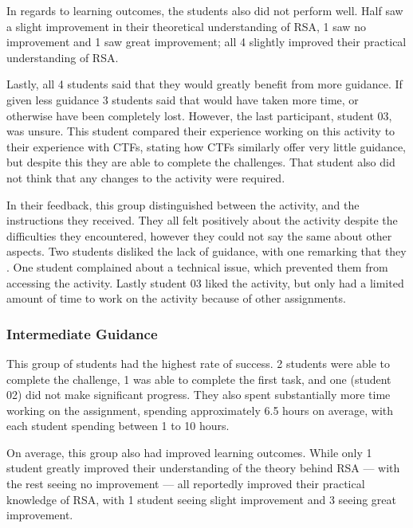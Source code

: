             In regards to learning outcomes, the students also did not perform well. %
Half saw a slight improvement in their theoretical understanding of RSA, 1 saw no improvement and 1 saw great improvement; %
all 4 slightly improved their practical understanding of RSA. 

            Lastly, all 4 students said that they would greatly benefit from more guidance. %
If given less guidance 3 students said that would have taken more time, or otherwise have been completely lost. %
However, the last participant, student 03, was unsure. %
This student compared their experience working on this activity to their experience with CTFs, stating how CTFs similarly offer very little guidance, but despite this they are able to complete the challenges. %
That student also did not think that any changes to the activity were required. 
            
            In their feedback, this group distinguished between the activity, and the instructions they received. %
They all felt positively about the activity despite the difficulties they encountered, however they could not say the same about other aspects. %
Two students disliked the lack of guidance, with one remarking that they . %
One student complained about a technical issue, which prevented them from accessing the activity. %
Lastly student 03 liked the activity, but only had a limited amount of time to work on the activity because of other assignments. 
        
        \subsubsection*{Intermediate Guidance}
            This group of students had the highest rate of success. %
2 students were able to complete the challenge, 1 was able to complete the first task, and one (student 02) did not make significant progress. %
They also spent substantially more time working on the assignment, spending approximately 6.5 hours on average, with each student spending between 1 to 10 hours.

            On average, this group also had improved learning outcomes. %
While only 1 student greatly improved their understanding of the theory behind RSA ---%
 with the rest seeing no improvement ---%
 all reportedly improved their practical knowledge of RSA, with 1 student seeing slight improvement and 3 seeing great improvement. 

